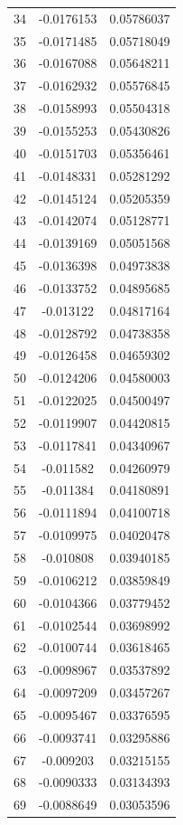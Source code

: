 \documentclass[a4paper, 11pt, oneside]{report}
\begin{document}
{\begin{longtable}{|c|c|c|}
34  & -0.0176153 & 0.05786037 \\
35  & -0.0171485 & 0.05718049 \\
36  & -0.0167088 & 0.05648211 \\
37  & -0.0162932 & 0.05576845 \\
38  & -0.0158993 & 0.05504318 \\
39  & -0.0155253 & 0.05430826 \\
40  & -0.0151703 & 0.05356461 \\
41  & -0.0148331 & 0.05281292 \\
42  & -0.0145124 & 0.05205359 \\
43  & -0.0142074 & 0.05128771 \\
44  & -0.0139169 & 0.05051568 \\
45  & -0.0136398 & 0.04973838 \\
46  & -0.0133752 & 0.04895685 \\
47  & -0.013122  & 0.04817164 \\
48  & -0.0128792 & 0.04738358 \\
49  & -0.0126458 & 0.04659302 \\
50  & -0.0124206 & 0.04580003 \\
51  & -0.0122025 & 0.04500497 \\
52  & -0.0119907 & 0.04420815 \\
53  & -0.0117841 & 0.04340967 \\
54  & -0.011582  & 0.04260979 \\
55  & -0.011384  & 0.04180891 \\
56  & -0.0111894 & 0.04100718 \\
57  & -0.0109975 & 0.04020478 \\
58  & -0.010808  & 0.03940185 \\
59  & -0.0106212 & 0.03859849 \\
60  & -0.0104366 & 0.03779452 \\
61  & -0.0102544 & 0.03698992 \\
62  & -0.0100744 & 0.03618465 \\
63  & -0.0098967 & 0.03537892 \\
64  & -0.0097209 & 0.03457267 \\
65  & -0.0095467 & 0.03376595 \\
66  & -0.0093741 & 0.03295886 \\
67  & -0.009203  & 0.03215155 \\
68  & -0.0090333 & 0.03134393 \\
69  & -0.0088649 & 0.03053596 \\

\end{longtable}}
\end{document}
